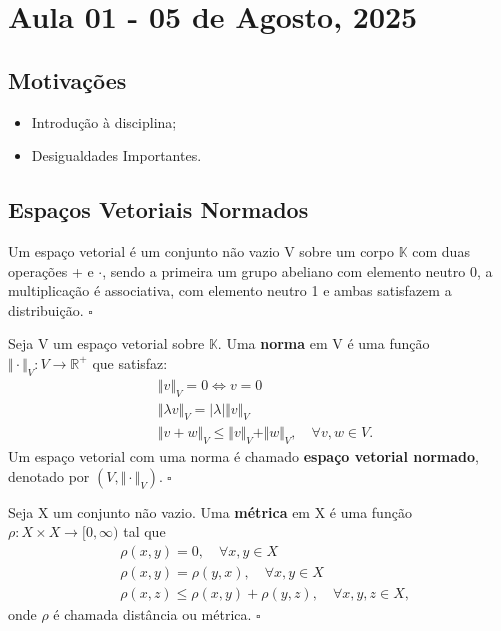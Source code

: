 \documentclass[../functional_analysis.tex]{subfiles}
\begin{document}
\section{Aula 01 - 05 de Agosto, 2025}
\subsection{Motivações}
\begin{itemize}
	\item Introdução à disciplina;
	\item Desigualdades Importantes.
\end{itemize}
\subsection{Espaços Vetoriais Normados}
\begin{def*}
	Um espaço vetorial é um conjunto não vazio V sobre um corpo \(\mathbb{K}\) com duas operações + e \(\cdot \), sendo a primeira um grupo abeliano com elemento neutro 0, a multiplicação é associativa, com elemento neutro 1 e ambas satisfazem a distribuição. \(\square\)
\end{def*}
\begin{def*}
	Seja V um espaço vetorial sobre \(\mathbb{K}\). Uma \textbf{norma} em V é uma função \(\Vert \cdot  \Vert_{V}:V\rightarrow \mathbb{R}^{+}\) que satisfaz:
	\begin{align*}
		 & \Vert v \Vert_{V} = 0 \Longleftrightarrow v = 0                                         \\
		 & \Vert \lambda v \Vert_{V} = |\lambda | \Vert v \Vert_{V}                                \\
		 & \Vert v+w \Vert_{V} \leq \Vert v \Vert_{V} + \Vert w \Vert_{V},\quad \forall v, w\in V.
	\end{align*}
	Um espaço vetorial com uma norma é chamado \textbf{espaço vetorial normado}, denotado por \((V, \Vert \cdot  \Vert_{V}).\; \square\)
\end{def*}
\begin{def*}
	Seja X um conjunto não vazio. Uma \textbf{métrica} em X é uma função \(\rho :X \times X\rightarrow [0, \infty)\) tal que
	\begin{align*}
		 & \rho (x, y) = 0,\quad \forall x, y\in X                               \\
		 & \rho (x, y) = \rho (y, x),\quad \forall x, y\in X                     \\
		 & \rho (x,z) \leq \rho (x, y) + \rho (y, z),\quad \forall x, y, z\in X,
	\end{align*}
	onde \(\rho \) é chamada distância ou métrica. \(\square\)
\end{def*}
\end{document}

